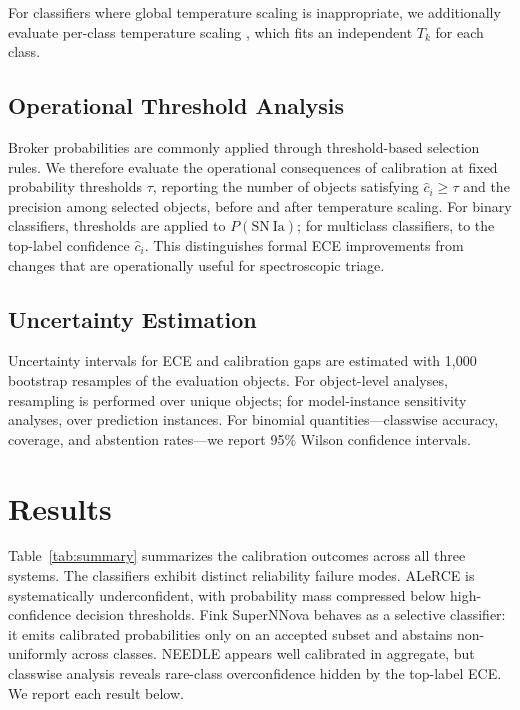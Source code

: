 \documentclass[twocolumn]{aastex631}
\begin{document}
For classifiers where global temperature scaling is inappropriate,
we additionally evaluate per-class temperature scaling
\citep{fang2020}, which fits an independent $T_k$ for each class.

\subsection{Operational Threshold Analysis}\label{sec:thresholds}

Broker probabilities are commonly applied through threshold-based
selection rules. We therefore evaluate the operational
consequences of calibration at fixed probability thresholds
$\tau$, reporting the number of objects satisfying $\hat{c}_i
\geq \tau$ and the precision among selected objects, before and
after temperature scaling. For binary classifiers, thresholds are
applied to $P(\mathrm{SN~Ia})$; for multiclass classifiers, to
the top-label confidence $\hat{c}_i$. This distinguishes formal
ECE improvements from changes that are operationally useful for
spectroscopic triage.

\subsection{Uncertainty Estimation}\label{sec:uncertainty}

Uncertainty intervals for ECE and calibration gaps are estimated
with 1{,}000 bootstrap resamples of the evaluation objects. For
object-level analyses, resampling is performed over unique
objects; for model-instance sensitivity analyses, over prediction
instances. For binomial quantities---classwise accuracy, coverage,
and abstention rates---we report 95\% Wilson confidence intervals.


\section{Results}\label{sec:results}

Table~\ref{tab:summary} summarizes the calibration outcomes across
all three systems. The classifiers exhibit distinct reliability
failure modes. ALeRCE is systematically underconfident, with
probability mass compressed below high-confidence decision
thresholds. Fink SuperNNova behaves as a selective classifier:
it emits calibrated probabilities only on an accepted subset and
abstains non-uniformly across classes. NEEDLE appears well
calibrated in aggregate, but classwise analysis reveals
rare-class overconfidence hidden by the top-label ECE.
We report each result below.
\end{document}

